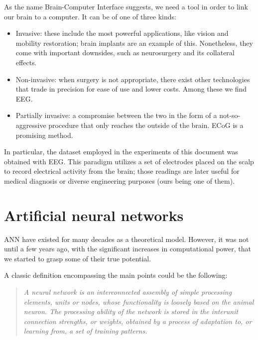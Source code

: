 	As the name Brain-Computer Interface suggests, we need a tool in order to link our brain to a computer. It can be of one of three kinds:

	\begin{itemize}

		\item
		Invasive: these include the most powerful applications, like vision and mobility restoration; brain implants are an example of this. Nonetheless, they come with important downsides, such as neurosurgery and its collateral effects.
		\item
		Non-invasive: when surgery is not appropriate, there exist other technologies that trade in precision for ease of use and lower costs. Among these we find \ac{EEG}.
		\item
		Partially invasive: a compromise between the two in the form of a not-so-aggressive procedure that only reaches the outside of the brain. \ac{ECoG} is a promising method.

	\end{itemize}

	In particular, the dataset employed in the experiments of this document was obtained with \acs{EEG}. This paradigm utilizes a set of electrodes placed on the scalp to record electrical activity from the brain; those readings are later useful for medical diagnosis or diverse engineering purposes (ours being one of them).

\section{Artificial neural networks}\label{sec:intro_nn}

	\ac{ANN} have existed for many decades as a theoretical model. However, it was not until a few years ago, with the significant increases in computational power, that we started to grasp some of their true potential.

	A classic definition encompassing the main points could be the following: 

	\begin{quotation}
		\textit{A neural network is an interconnected assembly of simple processing elements, units or nodes, whose functionality is loosely based on the animal neuron. The processing ability of the network is stored in the interunit connection strengths, or weights, obtained by a process of adaptation to, or learning from, a set of training patterns. \cite{nnintro}}
	\end{quotation}

